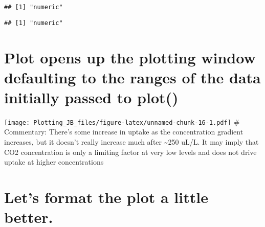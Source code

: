 \documentclass[]{article}
\newenvironment{Shaded}{\begin{snugshade}}{\end{snugshade}}
\newcommand{\DataTypeTok}[1]{\textcolor[rgb]{0.13,0.29,0.53}{#1}}
\newcommand{\KeywordTok}[1]{\textcolor[rgb]{0.13,0.29,0.53}{\textbf{#1}}}
\newcommand{\NormalTok}[1]{#1}
\newcommand{\OperatorTok}[1]{\textcolor[rgb]{0.81,0.36,0.00}{\textbf{#1}}}
\begin{document}
\begin{Shaded}
\end{Shaded}

\begin{verbatim}
## [1] "numeric"
\end{verbatim}

\begin{Shaded}
\end{Shaded}

\begin{verbatim}
## [1] "numeric"
\end{verbatim}

\hypertarget{plot-opens-up-the-plotting-window-defaulting-to-the-ranges-of-the-data-initially-passed-to-plot}{%
\section{Plot opens up the plotting window defaulting to the ranges of
the data initially passed to
plot()}\label{plot-opens-up-the-plotting-window-defaulting-to-the-ranges-of-the-data-initially-passed-to-plot}}

\begin{Shaded}
\end{Shaded}

\texttt{[image: Plotting\_JB\_files/figure-latex/unnamed-chunk-16-1.pdf]}
\# Commentary: There's some increase in uptake as the concentration
gradient increases, but it doesn't really increase much after
\textasciitilde{}250 uL/L. It may imply that CO2 concentration is only a
limiting factor at very low levels and does not drive uptake at higher
concentrations

\hypertarget{lets-format-the-plot-a-little-better.}{%
\section{Let's format the plot a little
better.}\label{lets-format-the-plot-a-little-better.}}
\end{document}
